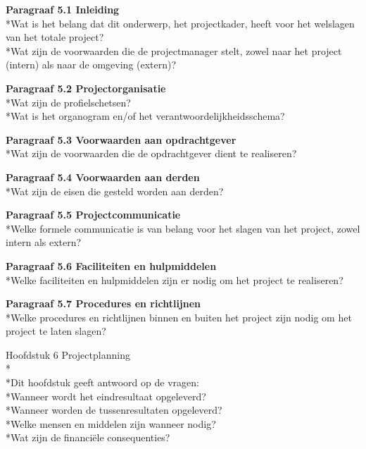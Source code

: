 \documentclass{article}
\begin{document}
\noindent
\textbf{Paragraaf 5.1 Inleiding}
\\*Wat is het belang dat dit onderwerp, het projectkader, heeft voor het welslagen van het totale project?
\\*Wat zijn de voorwaarden die de projectmanager stelt, zowel naar het project (intern) als naar de omgeving (extern)?
\newline

\noindent
\textbf{Paragraaf 5.2 Projectorganisatie}
\\*Wat zijn de profielschetsen?
\\*Wat is het organogram en/of het verantwoordelijkheidsschema?
\newline

\noindent
\textbf{Paragraaf 5.3 Voorwaarden aan opdrachtgever}
\\*Wat zijn de voorwaarden die de opdrachtgever dient te realiseren?
\newline

\noindent
\textbf{Paragraaf 5.4 Voorwaarden aan derden}
\\*Wat zijn de eisen die gesteld worden aan derden?
\newline

\noindent
\textbf{Paragraaf 5.5 Projectcommunicatie}
\\*Welke formele communicatie is van belang voor het slagen van het project, zowel intern als extern?
\newline

\noindent
\textbf{Paragraaf 5.6 Faciliteiten en hulpmiddelen}
\\*Welke faciliteiten en hulpmiddelen zijn er nodig om het project te realiseren?
\newline

\noindent
\textbf{Paragraaf 5.7 Procedures en richtlijnen}
\\*Welke procedures en richtlijnen binnen en buiten het project zijn nodig om het project te laten slagen?
\newline
\newline

Hoofdstuk 6 Projectplanning
\\*
\\*Dit hoofdstuk geeft antwoord op de vragen:
\\*Wanneer wordt het eindresultaat opgeleverd?
\\*Wanneer worden de tussenresultaten opgeleverd?
\\*Welke mensen en middelen zijn wanneer nodig?
\\*Wat zijn de financiële consequenties?
\newline
\end{document}
